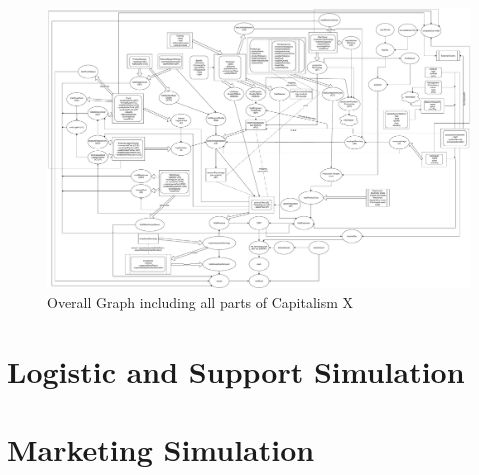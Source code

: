 \documentclass[11pt,titlepage,oneside,openany]{book}
\begin{document}
\begin{figure}[H]
    \includegraphics[angle=90, width=\textwidth]{fullGraph.pdf}
    \caption{Overall Graph including all parts of Capitalism X}
    \label{fig:OverallGraph}
\end{figure}










\section{Logistic and Support Simulation}



\section{Marketing Simulation}
\label{markting_simulation}










\end{document}
